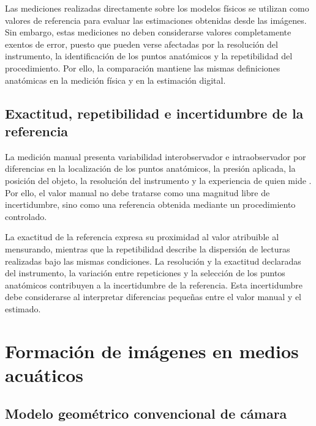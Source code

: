 \documentclass{report}
\begin{document}
Las mediciones realizadas directamente sobre los modelos físicos se utilizan como valores de referencia para evaluar las estimaciones obtenidas desde las imágenes. Sin embargo, estas mediciones no deben considerarse valores completamente exentos de error, puesto que pueden verse afectadas por la resolución del instrumento, la identificación de los puntos anatómicos y la repetibilidad del procedimiento. Por ello, la comparación mantiene las mismas definiciones anatómicas en la medición física y en la estimación digital.

\subsection{Exactitud, repetibilidad e incertidumbre de la referencia}

La medición manual presenta variabilidad interobservador e intraobservador por diferencias en la localización de los puntos anatómicos, la presión aplicada, la posición del objeto, la resolución del instrumento y la experiencia de quien mide \parencite{Petrtyl2014}. Por ello, el valor manual no debe tratarse como una magnitud libre de incertidumbre, sino como una referencia obtenida mediante un procedimiento controlado.

La exactitud de la referencia expresa su proximidad al valor atribuible al mensurando, mientras que la repetibilidad describe la dispersión de lecturas realizadas bajo las mismas condiciones. La resolución y la exactitud declaradas del instrumento, la variación entre repeticiones y la selección de los puntos anatómicos contribuyen a la incertidumbre de la referencia. Esta incertidumbre debe considerarse al interpretar diferencias pequeñas entre el valor manual y el estimado.

\section{Formación de imágenes en medios acuáticos}

\subsection{Modelo geométrico convencional de cámara}
\end{document}
